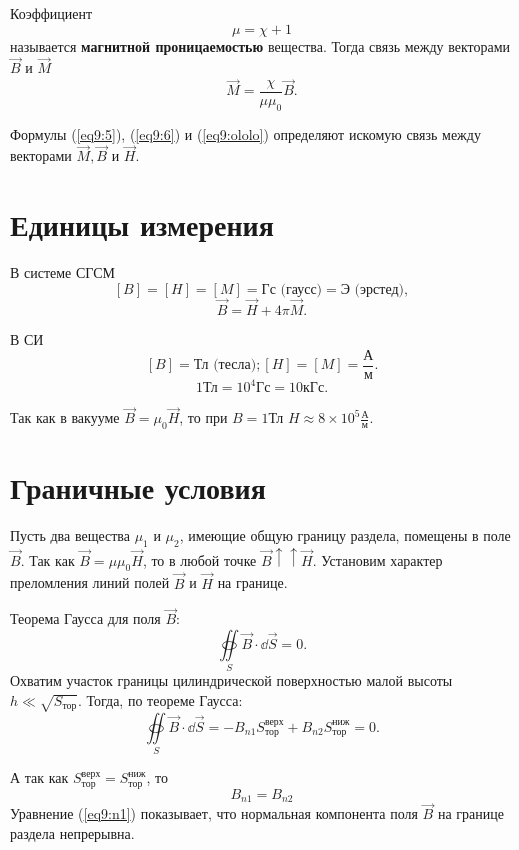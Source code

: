     Коэффициент
    \[
    \mu = \chi + 1 
    \]
    называется \textbf{магнитной проницаемостью} вещества. Тогда связь между
    векторами \( \vec{B} \) и \( \vec{M} \)
    \begin{equation}
         \vec{M} = \frac{\chi}{\mu\mu_0}\vec{B}.
         \label{eq9:ololo}
    \end{equation}

    Формулы (\ref{eq9:5}), (\ref{eq9:6}) и (\ref{eq9:ololo}) определяют искомую
    связь между векторами \( \vec{M}, \vec{B} \) и \( \vec{H} \).

\section{Единицы измерения}

    В системе СГСМ
    \[
        [B] = [H] = [M] = \text{Гс (гаусс)} = \text{Э (эрстед)},
    \]
    \[
        \vec{B} = \vec{H} + 4\pi\vec{M}.
    \]

    В СИ
    \[
        [B] = \text{Тл (тесла)}; [H] = [M] = \frac{\text{А}}{\text{м}}.
    \]
    \[
        1 \text{Тл} = 10^4 \text{Гс} = 10 \text{кГс}.
    \]

    Так как в вакууме \( \vec{B} = \mu_0\vec{H} \), то при \( B = 1 \)Тл 
    \( H \approx 8 \times 10^5 \frac{\text{А}}{\text{м}} \).

\section{Граничные условия}

    Пусть два вещества \( \mu_1 \) и \( \mu_2 \), имеющие общую границу раздела,
    помещены в поле \( \vec{B} \). Так как \( \vec{B} = \mu\mu_0\vec{H} \), то
    в любой точке \( \vec{B} \uparrow\uparrow \vec{H} \). Установим характер
    преломления линий полей \( \vec{B} \) и \( \vec{H} \) на границе.

    Теорема Гаусса для поля \( \vec{B} \):
    \[
        \oiint\limits_S \vec{B}\cdot\dd\vec{S} = 0.
    \]
    Охватим участок границы цилиндрической поверхностью малой высоты
    \( h \ll \sqrt{S_{\textit{тор}}} \). Тогда, по теореме Гаусса:
    \[
        \oiint\limits_S \vec{B}\cdot\dd\vec{S} = 
        -B_{n1}S_{\textit{тор}}^{\text{верх}} + 
        B_{n2}S_{\textit{тор}}^{\text{ниж}} = 0.
    \]
    
    А так как \( S_\textit{тор}^\text{верх} = S_\textit{тор}^\text{ниж} \), то
    \begin{equation}
        B_{n1} = B_{n2}
        \label{eq9:n1}
    \end{equation}
    Уравнение (\ref{eq9:n1}) показывает, что нормальная компонента поля
    \( \vec{B} \) на границе раздела непрерывна.

